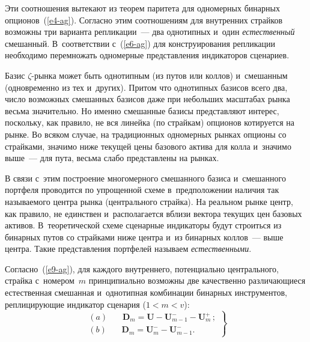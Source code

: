 \begin{multicols}{2}
  \vspace*{-6pt}
  
\noindent
  Эти соотношения вытекают из теорем паритета для одномерных бинарных 
опционов~(\ref{e4-ag}). Согласно этим соотношениям для 
внутренних страйков возможны три варианта репликации~--- два однотипных 
и~один \textit{естественный} смешанный. В~соответствии с~(\ref{e6-ag}) для 
конструирования репликации необходимо перемножать одномерные 
представления индикаторов сценариев. 
  
  Базис $\zeta$-рынка может быть однотипным (из путов или коллов) 
и~смешанным (одновременно из тех и~других). Притом что однотипных 
базисов всего два, число возможных смешанных базисов даже при небольших 
масштабах рынка весьма значительно. Но именно смешанные базисы 
представляют интерес, поскольку, как правило, не вся линейка (по страйкам) 
опционов котируется на рынке. Во всяком случае, на традиционных 
одномерных рынках опционы со страйками, значимо ниже текущей цены 
базового актива для колла и~значимо выше~--- для пута, весьма слабо 
представлены на рынках. 
  
  В связи с~этим построение многомерного смешанного базиса и~смешанного 
портфеля проводится по упрощенной схеме в~предположении наличия так 
называемого центра рынка (центрального страйка). На реальном рынке центр, 
как правило, не единствен и~располагается вблизи вектора текущих цен 
базовых активов. В~тео\-ре\-ти\-че\-ской схеме сценарные индикаторы будут 
строиться из бинарных путов со страйками ниже центра и~из бинарных 
коллов~--- выше центра. Такие представления портфелей называем 
\textit{естественными}. 
  
  Согласно~(\ref{e9-ag}), для каждого внутреннего, потенциально 
центрального, страйка с~номером~$m$ принципиально возможны две 
качественно раз\-ли\-ча\-ющи\-еся естественная смешанная и~однотипная\linebreak 
комбинации бинарных инструментов, реплицирующие индикатор сценария ($ 1<m<v$): 
  \begin{equation}
  \left.
  \begin{array}{l}
(a)~~~~~~~~\boldsymbol{D}_m=\boldsymbol{U}-\boldsymbol{U}^-_{m-1} - \boldsymbol{U}_m^+\,; \\[6pt]
(b)~~~~~~~~\boldsymbol{D}_m = \boldsymbol{U}_m^- - \boldsymbol{U}^-_{m-1}.
\end{array}
\right\}
   \label{e10-ag}
  \end{equation}
  
  \vspace*{-3pt}
  

\end{multicols}
